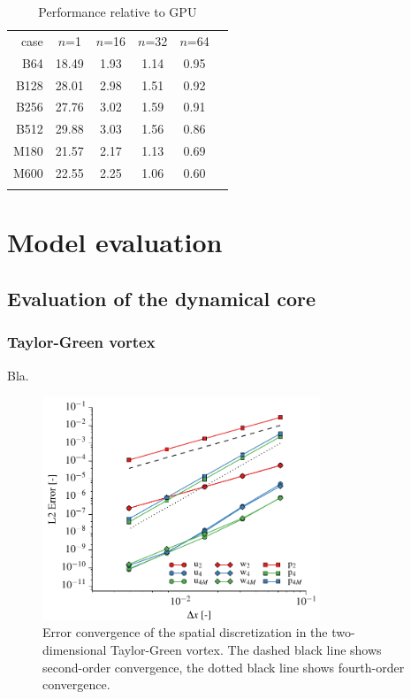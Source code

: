 \documentclass[gmd]{copernicus}
\begin{document}
\begin{table}[t]
\caption{Performance relative to GPU}
\begin{tabular}{rccccc}
\tophline
case & $n$=1 & $n$=16 & $n$=32 & $n$=64   \\
\middlehline
B64  & 18.49 & 1.93 & 1.14 & 0.95 \\
B128 & 28.01 & 2.98 & 1.51 & 0.92 \\
B256 & 27.76 & 3.02 & 1.59 & 0.91 \\
B512 & 29.88 & 3.03 & 1.56 & 0.86 \\
\middlehline
M180 & 21.57 & 2.17 & 1.13 & 0.69 \\
M600 & 22.55 & 2.25 & 1.06 & 0.60 \\
\bottomhline
\end{tabular}
\end{table}

\section{Model evaluation}
\subsection{Evaluation of the dynamical core}
\subsubsection{Taylor-Green vortex}
Bla.
\begin{figure}[t]
\vspace*{2mm}
\begin{center}
\includegraphics[width=8.3cm]{figs/taylorgreen.pdf}
\end{center}
\caption{Error convergence of the spatial discretization in the two-dimensional Taylor-Green vortex. The dashed black line shows second-order convergence, the dotted black line shows fourth-order convergence.}
\end{figure}
\end{document}
